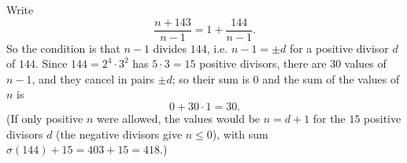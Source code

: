 Write
\[
\dfrac{n+143}{n-1}=1+\dfrac{144}{n-1}.
\]
So the condition is that $n-1$ divides $144$, i.e. $n-1=\pm d$ for a positive divisor $d$ of $144$. Since $144=2^4\cdot3^2$ has $5\cdot3=15$ positive divisors, there are $30$ values of $n-1$, and they cancel in pairs $\pm d$; so their sum is $0$ and the sum of the values of $n$ is
\[
0+30\cdot1=\boxed{30}.
\]
(If only positive $n$ were allowed, the values would be $n=d+1$ for the $15$ positive divisors $d$ (the negative divisors give $n\le0$), with sum $\sigma(144)+15=403+15=418$.)
